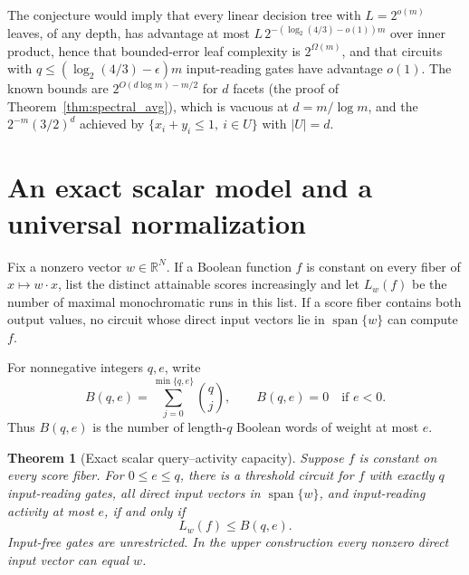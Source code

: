 \documentclass[11pt]{article}
\newtheorem{theorem}{Theorem}[section]
\theoremstyle{definition}
\newcommand{\R}{\mathbb R}
\begin{document}
The conjecture would imply that every linear decision tree with \(L=2^{o(m)}\) leaves, of any depth, has advantage at most \(L\,2^{-(\log_2(4/3)-o(1))m}\) over inner product, hence that bounded-error leaf complexity is \(2^{\Omega(m)}\), and that circuits with \(q\le(\log_2(4/3)-\epsilon)m\) input-reading gates have advantage \(o(1)\). The known bounds are \(2^{O(d\log m)-m/2}\) for \(d\) facets (the proof of Theorem~\ref{thm:spectral_avg}), which is vacuous at \(d=m/\log m\), and the \(2^{-m}(3/2)^d\) achieved by \(\{x_i+y_i\le1,\ i\in U\}\) with \(|U|=d\).

\section{An exact scalar model and a universal normalization}\label{sec:scalar_exact}

Fix a nonzero vector \(w\in\R^N\). If a Boolean function \(f\) is constant on every fiber of \(x\mapsto w\cdot x\), list the distinct attainable scores increasingly and let \(L_w(f)\) be the number of maximal monochromatic runs in this list. If a score fiber contains both output values, no circuit whose direct input vectors lie in \(\operatorname{span}\{w\}\) can compute \(f\).

For nonnegative integers \(q,e\), write
\[
 B(q,e)=\sum_{j=0}^{\min\{q,e\}}\binom qj,
 \qquad B(q,e)=0\quad\text{if }e<0.
\]
Thus \(B(q,e)\) is the number of length-\(q\) Boolean words of weight at most \(e\).

\begin{theorem}[Exact scalar query--activity capacity]\label{thm:scalar_exact}
Suppose \(f\) is constant on every score fiber. For \(0\le e\le q\), there is a threshold circuit for \(f\) with exactly \(q\) input-reading gates, all direct input vectors in \(\operatorname{span}\{w\}\), and input-reading activity at most \(e\), if and only if
\[
 L_w(f)\le B(q,e).
\]
Input-free gates are unrestricted. In the upper construction every nonzero direct input vector can equal \(w\).
\end{theorem}
\end{document}

